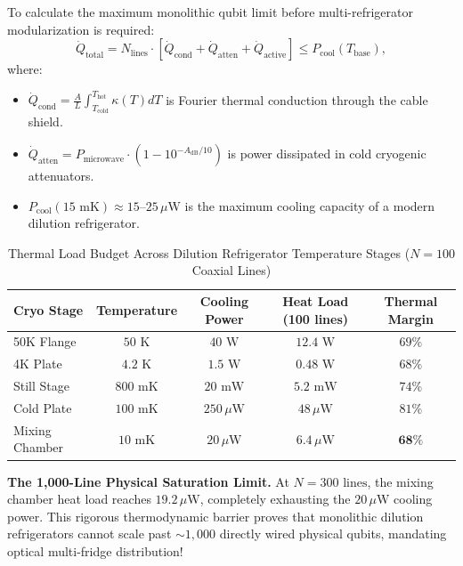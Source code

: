 To calculate the maximum monolithic qubit limit before multi-refrigerator modularization is required:
\begin{equation}
    \dot{Q}_{\text{total}} = N_{\text{lines}} \cdot \left[ \dot{Q}_{\text{cond}} + \dot{Q}_{\text{atten}} + \dot{Q}_{\text{active}} \right] \le P_{\text{cool}}(T_{\text{base}}),
    \label{eq:cryo_budget_formula_app_v2}
\end{equation}
where:
\begin{itemize}
    \item $\dot{Q}_{\text{cond}} = \frac{A}{L} \int_{T_{\text{cold}}}^{T_{\text{hot}}} \kappa(T) dT$ is Fourier thermal conduction through the cable shield.
    \item $\dot{Q}_{\text{atten}} = P_{\text{microwave}} \cdot (1 - 10^{-A_{\text{dB}}/10})$ is power dissipated in cold cryogenic attenuators.
    \item $P_{\text{cool}}(15\text{ mK}) \approx 15\text{--}25\,\mu\text{W}$ is the maximum cooling capacity of a modern dilution refrigerator.
\end{itemize}

\begin{table}[htbp]
    \centering
    \small
    \caption{Thermal Load Budget Across Dilution Refrigerator Temperature Stages ($N = 100$ Coaxial Lines)}
    \label{tab:cryo_stage_budget_expanded}
    \begin{tabular}{lcccc}
        \toprule
        \textbf{Cryo Stage} & \textbf{Temperature} & \textbf{Cooling Power} & \textbf{Heat Load (100 lines)} & \textbf{Thermal Margin} \\
        \midrule
        50K Flange & $50\text{ K}$ & $40\text{ W}$ & $12.4\text{ W}$ & $69\%$ \\
        4K Plate & $4.2\text{ K}$ & $1.5\text{ W}$ & $0.48\text{ W}$ & $68\%$ \\
        Still Stage & $800\text{ mK}$ & $20\text{ mW}$ & $5.2\text{ mW}$ & $74\%$ \\
        Cold Plate & $100\text{ mK}$ & $250\,\mu\text{W}$ & $48\,\mu\text{W}$ & $81\%$ \\
        Mixing Chamber & $10\text{ mK}$ & $20\,\mu\text{W}$ & $6.4\,\mu\text{W}$ & $\mathbf{68\%}$ \\
        \bottomrule
    \end{tabular}
\end{table}

\noindent \textbf{The 1,000-Line Physical Saturation Limit.} At $N = 300\text{ lines}$, the mixing chamber heat load reaches $19.2\,\mu\text{W}$, completely exhausting the $20\,\mu\text{W}$ cooling power. This rigorous thermodynamic barrier proves that monolithic dilution refrigerators cannot scale past $\sim 1,000$ directly wired physical qubits, mandating optical multi-fridge distribution!

